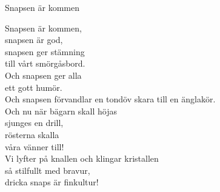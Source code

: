 \begin{song}{Snapsen är kommen}
	
	
	
	Snapsen är kommen,\\
	snapsen är god,\\
	snapsen ger stämning\\
	till vårt smörgåsbord.\\
	Och snapsen ger alla\\
	ett gott humör.\\
	Och snapsen förvandlar en tondöv skara till en änglakör.\\
	Och nu när bägarn skall höjas\\
	sjunges en drill,\\
	rösterna skalla\\
	våra vänner till!\\
	Vi lyfter på knallen och klingar kristallen\\
	så stilfullt med bravur,\\
	dricka snaps är finkultur!
	
\end{song}
